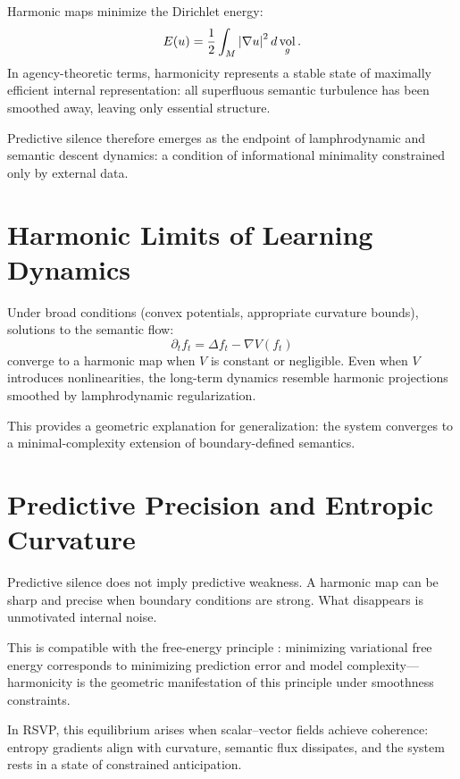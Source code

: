 \documentclass[12pt]{article}
\theoremstyle{plain}
\theoremstyle{definition}
\theoremstyle{remark}
\DeclareMathOperator{\vol}{vol}
\begin{document}
Harmonic maps minimize the Dirichlet energy:
\[
E(u) = \frac{1}{2} \int_M \abs{\nabla u}^2 \, d\vol_g.
\]
In agency-theoretic terms, harmonicity represents a stable state of 
maximally efficient internal representation: all superfluous semantic 
turbulence has been smoothed away, leaving only essential structure.

Predictive silence therefore emerges as the endpoint of lamphrodynamic and 
semantic descent dynamics: a condition of informational minimality constrained
only by external data.

\section{Harmonic Limits of Learning Dynamics}

Under broad conditions (convex potentials, appropriate curvature bounds), 
solutions to the semantic flow:
\[
\partial_t f_t = \Delta f_t - \nabla V(f_t)
\]
converge to a harmonic map when $V$ is constant or negligible. Even when 
$V$ introduces nonlinearities, the long-term dynamics resemble harmonic 
projections smoothed by lamphrodynamic regularization.

This provides a geometric explanation for generalization: the system converges 
to a minimal-complexity extension of boundary-defined semantics.

\section{Predictive Precision and Entropic Curvature}

Predictive silence does not imply predictive weakness. A harmonic map can be 
sharp and precise when boundary conditions are strong. What disappears is 
unmotivated internal noise.

This is compatible with the free-energy principle \citep{friston2010free}:
minimizing variational free energy corresponds to minimizing prediction error
and model complexity---harmonicity is the geometric manifestation of this 
principle under smoothness constraints.

In RSVP, this equilibrium arises when scalar–vector fields achieve coherence:
entropy gradients align with curvature, semantic flux dissipates, and the 
system rests in a state of constrained anticipation.

\newpage

\end{document}
